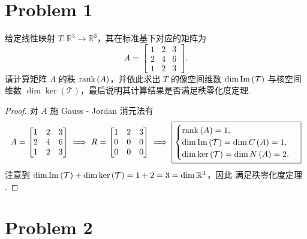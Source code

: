\section*{Problem 1}

给定线性映射 $T : \mathbb{R}^3 \to \mathbb{R}^3$，其在标准基下对应的矩阵为
\[
A =
\begin{bmatrix}
1 & 2 & 3 \\
2 & 4 & 6 \\
1 & 2 & 3
\end{bmatrix}.
\]
请计算矩阵 $A$ 的秩 $\mathrm{rank} \left(A\right)$，并依此求出 $T$ 的像空间维数 $\dim \mathrm{Im} \left(\mathcal{T}\right)$ 与核空间维数 $\dim \ker\left(\mathcal{T}\right)$，最后说明其计算结果是否满足秩零化度定理.

\begin{proof}
对 $A$ 施 Gauss - Jordan 消元法有
\[
A = \begin{bmatrix}
    1 & 2 & 3 \\
    2 & 4 & 6 \\
    1 & 2 & 3 \\
\end{bmatrix}
\implies
R = \begin{bmatrix}
    1 & 2 & 3 \\
    0 & 0 & 0 \\
    0 & 0 & 0 \\
\end{bmatrix}
\implies
\boxed{\begin{cases}
    \mathrm{rank} \left(A\right) = 1, \\
    \dim \mathrm{Im} \left(\mathcal{T}\right) = \dim C \left(A\right) = 1, \\
    \dim \ker \left(\mathcal{T}\right) = \dim N \left(A\right) = 2. \\
\end{cases}}
\]
注意到 $\dim \mathrm{Im} \left(\mathcal{T}\right) + \dim \ker\left(\mathcal{T}\right) = 1 + 2 = 3 = \dim \mathbb{R}^3$，因此 $\boxed{\text{满足秩零化度定理}}$.

\end{proof}

\section*{Problem 2}

